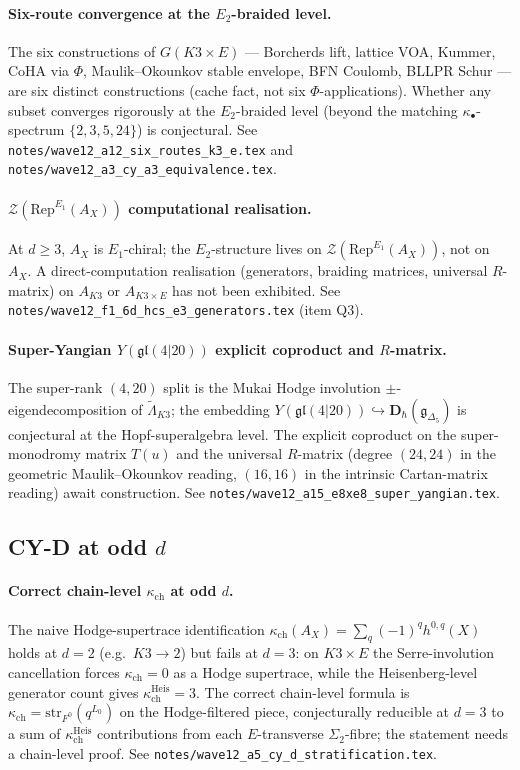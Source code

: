 \documentclass[11pt]{article}
\providecommand{\kch}{\kappa_{\mathrm{ch}}}
\providecommand{\Eone}{E_1}
\providecommand{\Etwo}{E_2}
\providecommand{\fg}{\mathfrak{g}}
\providecommand{\fgl}{\mathfrak{gl}}
\begin{document}
\paragraph{Six-route convergence at the $\Etwo$-braided level.} The
six constructions of $G(K3 \times E)$ --- Borcherds lift, lattice VOA,
Kummer, CoHA via $\Phi$, Maulik--Okounkov stable envelope,
BFN Coulomb, BLLPR Schur --- are six distinct constructions
(cache fact, not six $\Phi$-applications). Whether any subset
converges rigorously at the $\Etwo$-braided level (beyond the
matching $\kappa_\bullet$-spectrum $\{2, 3, 5, 24\}$) is conjectural.
See \texttt{notes/wave12\_a12\_six\_routes\_k3\_e.tex} and
\texttt{notes/wave12\_a3\_cy\_a3\_equivalence.tex}.

\paragraph{$\mathcal{Z}(\mathrm{Rep}^{\Eone}(A_X))$ computational
realisation.} At $d \geq 3$, $A_X$ is $\Eone$-chiral; the
$\Etwo$-structure lives on $\mathcal{Z}(\mathrm{Rep}^{\Eone}(A_X))$,
not on $A_X$. A direct-computation realisation (generators, braiding
matrices, universal $R$-matrix) on $A_{K3}$ or $A_{K3 \times E}$ has
not been exhibited. See
\texttt{notes/wave12\_f1\_6d\_hcs\_e3\_generators.tex}
(item Q3).

\paragraph{Super-Yangian $Y(\fgl(4|20))$ explicit coproduct and
$R$-matrix.} The super-rank $(4, 20)$ split is the Mukai Hodge
involution $\pm$-eigendecomposition of $\widetilde\Lambda_{K3}$; the
embedding $Y(\fgl(4|20)) \hookrightarrow \mathbf{D}_\hbar(\fg_{\Delta_5})$
is conjectural at the Hopf-superalgebra level. The explicit
coproduct on the super-monodromy matrix $T(u)$ and the universal
$R$-matrix (degree $(24, 24)$ in the geometric
Maulik--Okounkov reading, $(16, 16)$ in the intrinsic Cartan-matrix
reading) await construction. See
\texttt{notes/wave12\_a15\_e8xe8\_super\_yangian.tex}.

\subsection{CY-D at odd $d$}

\paragraph{Correct chain-level $\kch$ at odd $d$.} The naive
Hodge-supertrace identification $\kch(A_X) = \sum_q (-1)^q h^{0, q}(X)$
holds at $d = 2$ (e.g.~$K3 \to 2$) but fails at $d = 3$: on
$K3 \times E$ the Serre-involution cancellation forces $\kch = 0$ as
a Hodge supertrace, while the Heisenberg-level generator count
gives $\kch^{\mathrm{Heis}} = 3$. The correct chain-level formula is
$\kch = \mathrm{str}_{F^0}(q^{L_0})$ on the Hodge-filtered piece,
conjecturally reducible at $d = 3$ to a sum of $\kch^{\mathrm{Heis}}$
contributions from each $E$-transverse $\Sigma_2$-fibre; the
statement needs a chain-level proof. See
\texttt{notes/wave12\_a5\_cy\_d\_stratification.tex}.
\end{document}

